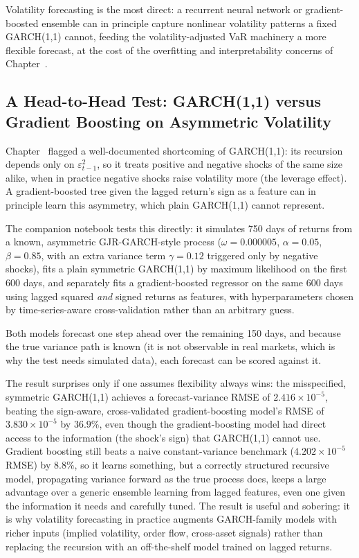 \documentclass[../ai_in_finance]{subfiles}
\begin{document}
Volatility forecasting is the most direct: a recurrent neural network or gradient-boosted ensemble can in principle capture nonlinear volatility patterns a fixed GARCH(1,1) cannot, feeding the volatility-adjusted VaR machinery a more flexible forecast, at the cost of the overfitting and interpretability concerns of Chapter~.

\subsection{A Head-to-Head Test: GARCH(1,1) versus Gradient Boosting on Asymmetric Volatility}
\label{sec:ml-vol-forecast}

Chapter~ flagged a well-documented shortcoming of GARCH(1,1): its recursion depends only on $\varepsilon_{t-1}^2$, so it treats positive and negative shocks of the same size alike, when in practice negative shocks raise volatility more (the leverage effect). A gradient-boosted tree given the lagged return's sign as a feature can in principle learn this asymmetry, which plain GARCH(1,1) cannot represent.

The companion notebook tests this directly: it simulates 750 days of returns from a known, asymmetric GJR-GARCH-style process ($\omega=0.000005$, $\alpha=0.05$, $\beta=0.85$, with an extra variance term $\gamma=0.12$ triggered only by negative shocks), fits a plain symmetric GARCH(1,1) by maximum likelihood on the first 600 days, and separately fits a gradient-boosted regressor on the same 600 days using lagged squared \emph{and} signed returns as features, with hyperparameters chosen by time-series-aware cross-validation rather than an arbitrary guess.

Both models forecast one step ahead over the remaining 150 days, and because the true variance path is known (it is not observable in real markets, which is why the test needs simulated data), each forecast can be scored against it.

The result surprises only if one assumes flexibility always wins: the misspecified, symmetric GARCH(1,1) achieves a forecast-variance RMSE of $2.416\times10^{-5}$, beating the sign-aware, cross-validated gradient-boosting model's RMSE of $3.830\times10^{-5}$ by $36.9\%$, even though the gradient-boosting model had direct access to the information (the shock's sign) that GARCH(1,1) cannot use.
Gradient boosting still beats a naive constant-variance benchmark ($4.202\times10^{-5}$ RMSE) by $8.8\%$, so it learns something, but a correctly structured recursive model, propagating variance forward as the true process does, keeps a large advantage over a generic ensemble learning from lagged features, even one given the information it needs and carefully tuned.
The result is useful and sobering: it is why volatility forecasting in practice augments GARCH-family models with richer inputs (implied volatility, order flow, cross-asset signals) rather than replacing the recursion with an off-the-shelf model trained on lagged returns.
\end{document}
